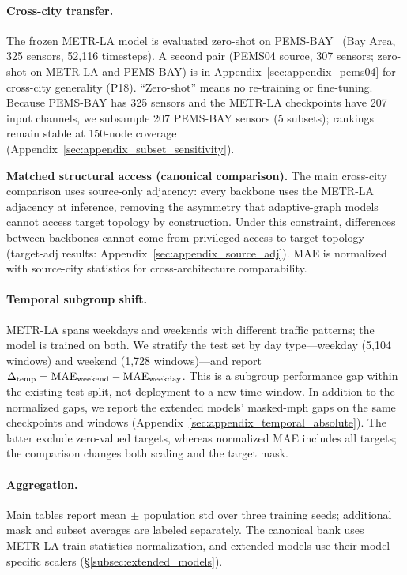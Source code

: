 \paragraph{Cross-city transfer.}
The frozen METR-LA model is evaluated zero-shot on
PEMS-BAY~\citep{li2018dcrnn} (Bay Area, 325 sensors, 52,116 timesteps).
A second pair (PEMS04 source, 307 sensors; zero-shot on METR-LA and PEMS-BAY)
is in Appendix~\ref{sec:appendix_pems04} for cross-city generality (P18).
``Zero-shot'' means no re-training or fine-tuning. Because PEMS-BAY has 325
sensors and the METR-LA checkpoints have 207 input channels, we subsample 207
PEMS-BAY sensors (5 subsets); rankings remain stable at 150-node coverage
(Appendix~\ref{sec:appendix_subset_sensitivity}).

\textbf{Matched structural access (canonical comparison).}
The main cross-city comparison uses source-only adjacency: every backbone
uses the METR-LA adjacency at inference, removing the asymmetry that
adaptive-graph models cannot access target topology by construction.
Under this constraint, differences between backbones cannot come from
privileged access to target topology
(target-adj results: Appendix~\ref{sec:appendix_source_adj}).
MAE is normalized with source-city statistics for cross-architecture
comparability.

\paragraph{Temporal subgroup shift.}
METR-LA spans weekdays and weekends with different traffic patterns; the
model is trained on both. We stratify the test set by day type---weekday
(5,104 windows) and weekend (1,728 windows)---and report
$\Delta_{\text{temp}} = \mathrm{MAE}_{\text{weekend}} - \mathrm{MAE}_{\text{weekday}}$.
This is a subgroup performance gap within the existing test split, not
deployment to a new time window. In addition to the normalized gaps, we report
the extended models' masked-mph gaps on the same checkpoints and windows
(Appendix~\ref{sec:appendix_temporal_absolute}). The latter exclude zero-valued
targets, whereas normalized MAE includes all targets; the comparison changes
both scaling and the target mask.

\paragraph{Aggregation.}
Main tables report mean$\,\pm\,$population std over three training seeds;
additional mask and subset averages are labeled separately. The canonical
bank uses METR-LA train-statistics normalization, and extended models use
their model-specific scalers (\S\ref{subsec:extended_models}).
